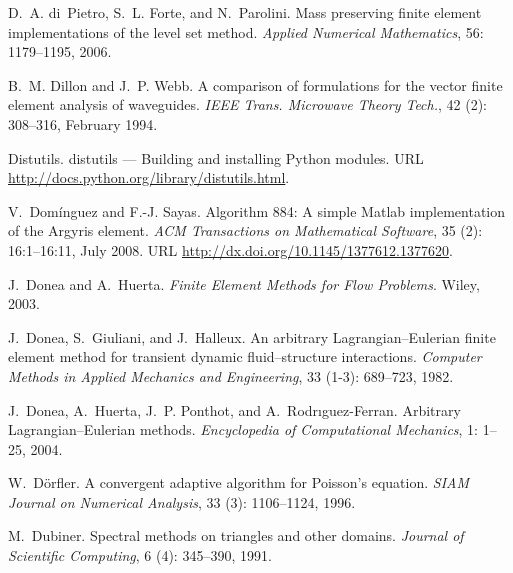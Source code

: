 \begin{thebibliography}{467}
D.~A. di~Pietro, S.~L. Forte, and N.~Parolini.
\newblock Mass preserving finite element implementations of the level set
  method.
\newblock \emph{Applied Numerical Mathematics}, 56: 1179--1195, 2006.

B.~M. Dillon and J.~P. Webb.
\newblock A comparison of formulations for the vector finite element analysis
  of waveguides.
\newblock \emph{IEEE Trans. Microwave Theory Tech.}, 42 (2):
  308--316, February 1994.

Distutils.
\newblock distutils — {B}uilding and installing {P}ython modules.
\newblock URL \url{http://docs.python.org/library/distutils.html}.

V.~Dom\'{i}nguez and F.-J. Sayas.
\newblock Algorithm 884: A simple {Matlab} implementation of the {Argyris}
  element.
\newblock \emph{ACM Transactions on Mathematical Software}, 35
  (2): 16:1--16:11, July 2008.
\newblock URL \url{http://dx.doi.org/10.1145/1377612.1377620}.

J.~Donea and A.~Huerta.
\newblock \emph{Finite Element Methods for Flow Problems}.
\newblock Wiley, 2003.

J.~Donea, S.~Giuliani, and J.~Halleux.
\newblock An arbitrary {L}agrangian--{E}ulerian finite element method for
  transient dynamic fluid--structure interactions.
\newblock \emph{Computer Methods in Applied Mechanics and Engineering},
  33 (1-3): 689--723, 1982.

J.~Donea, A.~Huerta, J.~P. Ponthot, and A.~Rodr{\i}guez-Ferran.
\newblock Arbitrary {L}agrangian--{E}ulerian methods.
\newblock \emph{Encyclopedia of Computational Mechanics}, 1: 1--25,
  2004.

W.~D\"{o}rfler.
\newblock A convergent adaptive algorithm for {P}oisson's equation.
\newblock \emph{SIAM Journal on Numerical Analysis}, 33 (3):
  1106--1124, 1996.

M.~Dubiner.
\newblock Spectral methods on triangles and other domains.
\newblock \emph{Journal of Scientific Computing}, 6 (4):
  345--390, 1991.


\end{thebibliography}
